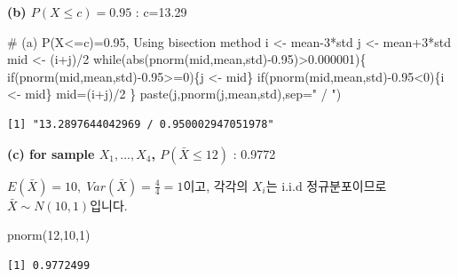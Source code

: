 \documentclass[
  letterpaper,
  DIV=11,
  numbers=noendperiod]{scrreprt}
\newenvironment{Shaded}{\begin{snugshade}}{\end{snugshade}}
\newcommand{\AttributeTok}[1]{\textcolor[rgb]{0.40,0.45,0.13}{#1}}
\newcommand{\CommentTok}[1]{\textcolor[rgb]{0.37,0.37,0.37}{#1}}
\newcommand{\ControlFlowTok}[1]{\textcolor[rgb]{0.00,0.23,0.31}{#1}}
\newcommand{\DecValTok}[1]{\textcolor[rgb]{0.68,0.00,0.00}{#1}}
\newcommand{\FloatTok}[1]{\textcolor[rgb]{0.68,0.00,0.00}{#1}}
\newcommand{\FunctionTok}[1]{\textcolor[rgb]{0.28,0.35,0.67}{#1}}
\newcommand{\NormalTok}[1]{\textcolor[rgb]{0.00,0.23,0.31}{#1}}
\newcommand{\OtherTok}[1]{\textcolor[rgb]{0.00,0.23,0.31}{#1}}
\newcommand{\SpecialCharTok}[1]{\textcolor[rgb]{0.37,0.37,0.37}{#1}}
\newcommand{\StringTok}[1]{\textcolor[rgb]{0.13,0.47,0.30}{#1}}
\begin{document}
\textbf{(b) \(P(X\leq c)=0.95\)} : c=13.29

\begin{Shaded}
\begin{Highlighting}[]
\CommentTok{\# (a) P(X\textless{}=c)=0.95, Using bisection method}
\NormalTok{i }\OtherTok{\textless{}{-}}\NormalTok{ mean}\DecValTok{{-}3}\SpecialCharTok{*}\NormalTok{std}
\NormalTok{j }\OtherTok{\textless{}{-}}\NormalTok{ mean}\SpecialCharTok{+}\DecValTok{3}\SpecialCharTok{*}\NormalTok{std}
\NormalTok{mid }\OtherTok{\textless{}{-}}\NormalTok{ (i}\SpecialCharTok{+}\NormalTok{j)}\SpecialCharTok{/}\DecValTok{2}
\ControlFlowTok{while}\NormalTok{(}\FunctionTok{abs}\NormalTok{(}\FunctionTok{pnorm}\NormalTok{(mid,mean,std)}\SpecialCharTok{{-}}\FloatTok{0.95}\NormalTok{)}\SpecialCharTok{\textgreater{}}\FloatTok{0.000001}\NormalTok{)\{}
  \ControlFlowTok{if}\NormalTok{(}\FunctionTok{pnorm}\NormalTok{(mid,mean,std)}\SpecialCharTok{{-}}\FloatTok{0.95}\SpecialCharTok{\textgreater{}=}\DecValTok{0}\NormalTok{)\{j }\OtherTok{\textless{}{-}}\NormalTok{ mid\}}
  \ControlFlowTok{if}\NormalTok{(}\FunctionTok{pnorm}\NormalTok{(mid,mean,std)}\SpecialCharTok{{-}}\FloatTok{0.95}\SpecialCharTok{\textless{}}\DecValTok{0}\NormalTok{)\{i }\OtherTok{\textless{}{-}}\NormalTok{ mid\}}
\NormalTok{  mid}\OtherTok{=}\NormalTok{(i}\SpecialCharTok{+}\NormalTok{j)}\SpecialCharTok{/}\DecValTok{2}
\NormalTok{\}}
\FunctionTok{paste}\NormalTok{(j,}\FunctionTok{pnorm}\NormalTok{(j,mean,std),}\AttributeTok{sep=}\StringTok{" / "}\NormalTok{)}
\end{Highlighting}
\end{Shaded}

\begin{verbatim}
[1] "13.2897644042969 / 0.950002947051978"
\end{verbatim}

\textbf{(c) for sample \({X_1,...,X_4}\), \(P(\bar{X}\leq 12)\)} :
0.9772

\(E(\bar{X})=10,\;Var(\bar{X})=\frac{4}{4}=1\)이고, 각각의 \(X_i\)는
i.i.d 정규분포이므로 \(\bar{X}\sim N(10,1)\)입니다.

\begin{Shaded}
\begin{Highlighting}[]
\FunctionTok{pnorm}\NormalTok{(}\DecValTok{12}\NormalTok{,}\DecValTok{10}\NormalTok{,}\DecValTok{1}\NormalTok{)}
\end{Highlighting}
\end{Shaded}

\begin{verbatim}
[1] 0.9772499
\end{verbatim}
\end{document}
